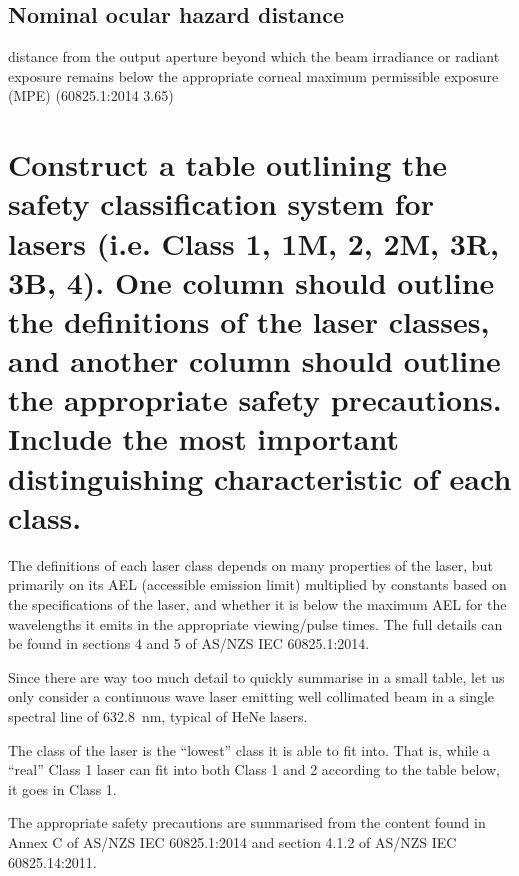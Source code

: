 \documentclass[a4paper]{scrartcl}
\begin{document}
\subsection{Nominal ocular hazard distance}
distance from the output aperture beyond which the beam irradiance or radiant exposure remains below the appropriate corneal maximum permissible exposure (MPE) (60825.1:2014 3.65)

\section{Construct a table outlining the safety classification system for lasers (i.e. Class 1, 1M, 2, 2M, 3R, 3B, 4). One column should outline the definitions of the laser classes, and another column should outline the appropriate safety precautions. Include the most important distinguishing characteristic of each class.}
The definitions of each laser class depends on many properties of the laser, but primarily on its AEL (accessible emission limit) multiplied by constants based on the specifications of the laser, and whether it is below the maximum AEL for the wavelengths it emits in the appropriate viewing/pulse times. The full details can be found in sections 4 and 5 of AS/NZS IEC 60825.1:2014.

Since there are way too much detail to quickly summarise in a small table, let us only consider a continuous wave laser emitting well collimated beam in a single spectral line of \SI{632.8}{\nano\metre}, typical of HeNe lasers.

The class of the laser is the ``lowest'' class it is able to fit into. That is, while a ``real'' Class 1 laser can fit into both Class 1 and 2 according to the table below, it goes in Class 1.

The appropriate safety precautions are summarised from the content found in Annex C of AS/NZS IEC 60825.1:2014 and section 4.1.2 of AS/NZS IEC 60825.14:2011.
\end{document}
